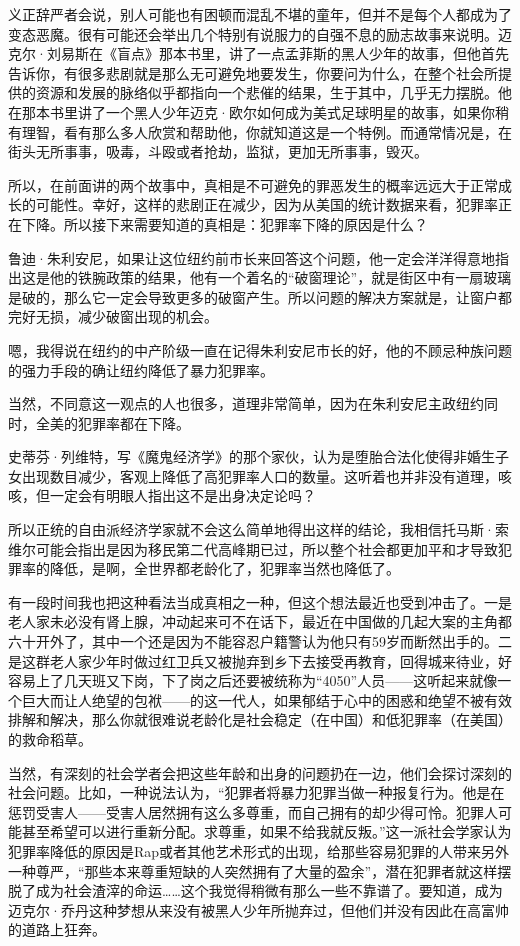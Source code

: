 义正辞严者会说，别人可能也有困顿而混乱不堪的童年，但并不是每个人都成为了变态恶魔。很有可能还会举出几个特别有说服力的自强不息的励志故事来说明。迈克尔·刘易斯在《盲点》那本书里，讲了一点孟菲斯的黑人少年的故事，但他首先告诉你，有很多悲剧就是那么无可避免地要发生，你要问为什么，在整个社会所提供的资源和发展的脉络似乎都指向一个悲催的结果，生于其中，几乎无力摆脱。他在那本书里讲了一个黑人少年迈克·欧尔如何成为美式足球明星的故事，如果你稍有理智，看有那么多人欣赏和帮助他，你就知道这是一个特例。而通常情况是，在街头无所事事，吸毒，斗殴或者抢劫，监狱，更加无所事事，毁灭。

所以，在前面讲的两个故事中，真相是不可避免的罪恶发生的概率远远大于正常成长的可能性。幸好，这样的悲剧正在减少，因为从美国的统计数据来看，犯罪率正在下降。所以接下来需要知道的真相是：犯罪率下降的原因是什么？

鲁迪·朱利安尼，如果让这位纽约前市长来回答这个问题，他一定会洋洋得意地指出这是他的铁腕政策的结果，他有一个着名的``破窗理论''，就是街区中有一扇玻璃是破的，那么它一定会导致更多的破窗产生。所以问题的解决方案就是，让窗户都完好无损，减少破窗出现的机会。

嗯，我得说在纽约的中产阶级一直在记得朱利安尼市长的好，他的不顾忌种族问题的强力手段的确让纽约降低了暴力犯罪率。

当然，不同意这一观点的人也很多，道理非常简单，因为在朱利安尼主政纽约同时，全美的犯罪率都在下降。

史蒂芬·列维特，写《魔鬼经济学》的那个家伙，认为是堕胎合法化使得非婚生子女出现数目减少，客观上降低了高犯罪率人口的数量。这听着也并非没有道理，咳咳，但一定会有明眼人指出这不是出身决定论吗？

所以正统的自由派经济学家就不会这么简单地得出这样的结论，我相信托马斯·索维尔可能会指出是因为移民第二代高峰期已过，所以整个社会都更加平和才导致犯罪率的降低，是啊，全世界都老龄化了，犯罪率当然也降低了。

有一段时间我也把这种看法当成真相之一种，但这个想法最近也受到冲击了。一是老人家未必没有肾上腺，冲动起来可不在话下，最近在中国做的几起大案的主角都六十开外了，其中一个还是因为不能容忍户籍警认为他只有59岁而断然出手的。二是这群老人家少年时做过红卫兵又被抛弃到乡下去接受再教育，回得城来待业，好容易上了几天班又下岗，下了岗之后还要被统称为``4050''人员------这听起来就像一个巨大而让人绝望的包袱------的这一代人，如果郁结于心中的困惑和绝望不被有效排解和解决，那么你就很难说老龄化是社会稳定（在中国）和低犯罪率（在美国）的救命稻草。

当然，有深刻的社会学者会把这些年龄和出身的问题扔在一边，他们会探讨深刻的社会问题。比如，一种说法认为，``犯罪者将暴力犯罪当做一种报复行为。他是在惩罚受害人------受害人居然拥有这么多尊重，而自己拥有的却少得可怜。犯罪人可能甚至希望可以进行重新分配。求尊重，如果不给我就反叛。''这一派社会学家认为犯罪率降低的原因是Rap或者其他艺术形式的出现，给那些容易犯罪的人带来另外一种尊严，``那些本来尊重短缺的人突然拥有了大量的盈余''，潜在犯罪者就这样摆脱了成为社会渣滓的命运\ldots{}\ldots{}这个我觉得稍微有那么一些不靠谱了。要知道，成为迈克尔·乔丹这种梦想从来没有被黑人少年所抛弃过，但他们并没有因此在高富帅的道路上狂奔。

